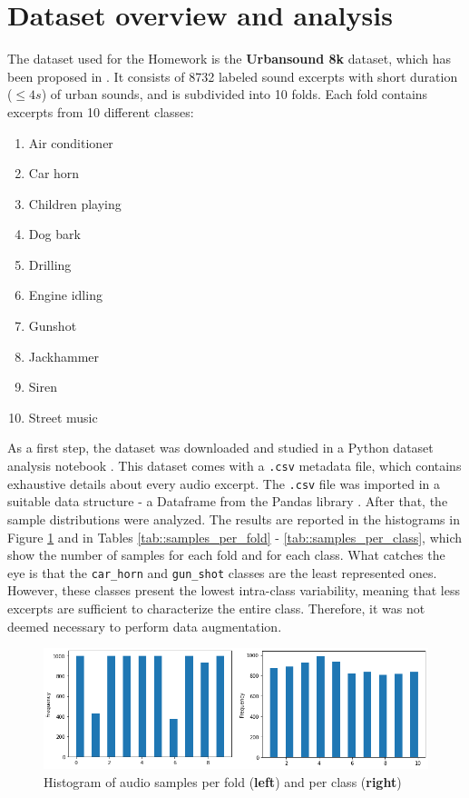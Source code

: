 \documentclass{article}
\newcommand{\code}{\texttt}
\begin{document}
\section{Dataset overview and analysis}
The dataset used for the Homework is the \textbf{Urbansound 8k} dataset, which has been proposed in \cite{SalamonUrbanSound}. It consists of 8732 labeled sound excerpts with short duration ($\leq 4s$) of urban sounds, and is subdivided into 10 folds. Each fold contains excerpts from 10 different classes:
\begin{enumerate}[itemsep=0em]
    \item Air conditioner
    \item Car horn
    \item Children playing
    \item Dog bark
    \item Drilling
    \item Engine idling
    \item Gunshot
    \item Jackhammer
    \item Siren
    \item Street music
\end{enumerate}
As a first step, the dataset was downloaded and studied in a Python dataset analysis notebook \cite{githubRepo}. This dataset comes with a \code{.csv} metadata file, which contains exhaustive details about every audio excerpt. The \code{.csv} file was imported in a suitable data structure - a Dataframe from the Pandas library \cite{pandas}. After that, the sample distributions were analyzed. The results are reported in the histograms in Figure \ref{fig:samples_histogram} and in Tables \ref{tab::samples_per_fold} - \ref{tab::samples_per_class}, which show the number of samples for each fold and for each class. What catches the eye is that the \texttt{car\_horn} and \texttt{gun\_shot} classes are the least represented ones. However, these classes present the lowest intra-class variability, meaning that less excerpts are sufficient to characterize the entire class. Therefore, it was not deemed necessary to perform data augmentation.

\begin{figure}[ht]
    \centering
    \includegraphics[scale=0.4]{img/SamplesPerClass_SamplesPerFold.png}
    \caption{Histogram of audio samples per fold (\textbf{left}) and per class (\textbf{right})}
    \label{fig:samples_histogram}
\end{figure}
\end{document}
